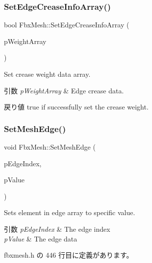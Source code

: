 \subsubsection{\texorpdfstring{Set\+Edge\+Crease\+Info\+Array()}{SetEdgeCreaseInfoArray()}}
{\footnotesize\ttfamily bool Fbx\+Mesh\+::\+Set\+Edge\+Crease\+Info\+Array (\begin{DoxyParamCaption}\item[{\hyperlink{class_fbx_array}{Fbx\+Array}$<$ double $>$ $\ast$}]{p\+Weight\+Array }\end{DoxyParamCaption})}

Set crease weight data array. 
\begin{DoxyParams}{引数}
{\em p\+Weight\+Array} & Edge crease data. \\
\hline
\end{DoxyParams}
\begin{DoxyReturn}{戻り値}
{\ttfamily true} if successfully set the crease weight. 
\end{DoxyReturn}
\mbox{\label{class_fbx_mesh_a0a1288c874a40992ae4db6c0905ca2c0}} 
\subsubsection{\texorpdfstring{Set\+Mesh\+Edge()}{SetMeshEdge()}}
{\footnotesize\ttfamily void Fbx\+Mesh\+::\+Set\+Mesh\+Edge (\begin{DoxyParamCaption}\item[{int}]{p\+Edge\+Index,  }\item[{int}]{p\+Value }\end{DoxyParamCaption})\hspace{0.3cm}{\ttfamily [inline]}}

Sets element in edge array to specific value. 
\begin{DoxyParams}{引数}
{\em p\+Edge\+Index} & The edge index \\
\hline
{\em p\+Value} & The edge data \\
\hline
\end{DoxyParams}


 fbxmesh.\+h の 446 行目に定義があります。

\mbox{\label{class_fbx_mesh_a8a0ca6b1202ad971d3f504e801bf53ac}} 
